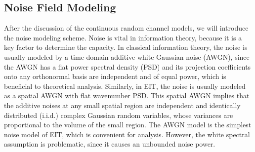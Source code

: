\documentclass[journal,twocolumn]{IEEEtran}
\begin{document}
\vspace{-3mm}
\subsection{Noise Field Modeling}
After the discussion of the continuous random channel models, we will introduce the noise modeling scheme. 
Noise is vital in information theory, because it is a key factor to determine the capacity. 
In classical information theory, the noise is usually modeled by a time-domain additive white Gaussian noise (AWGN), since the AWGN has a flat power spectral density (PSD) and its projection coefficients onto any orthonormal basis are independent and of equal power, which is beneficial to theoretical analysis. 
Similarly, in EIT, the noise is usually modeled as a spatial AWGN with flat wavenumber PSD. This spatial AWGN implies that the additive noises at any small spatial region are independent and identically distributed (i.i.d.) complex Gaussian random variables, whose variances are proportional to the volume of the small region. The AWGN model is the simplest noise model of EIT, which is convenient for analysis. However, the white spectral assumption is problematic, since it causes an unbounded noise power. 

\end{document}
